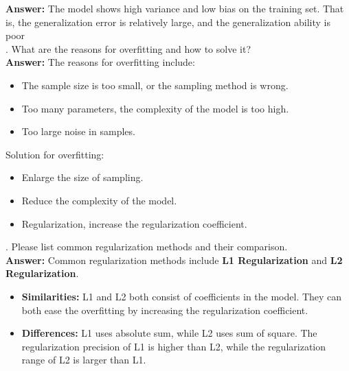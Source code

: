 \documentclass{article}
\begin{document}
\textbf{Answer:} The model shows high variance and low bias on the training set. That is, the generalization error is relatively large, and the generalization ability is poor\\

. What are the reasons for overfitting and how to solve it? \\ 

\textbf{Answer:} The reasons for overfitting include: 

\begin{itemize}
    \item The sample size is too small, or the sampling method is wrong.
    
    \item Too many parameters, the complexity of the model is too high.
    
    \item Too large noise in samples.
\end{itemize}

Solution for overfitting:

\begin{itemize}
    \item Enlarge the size of sampling.
    
    \item Reduce the complexity of the model.
    
    \item Regularization, increase the regularization coefficient.
\end{itemize}  



. Please list common regularization methods and their comparison. \\ 

\textbf{Answer:} Common regularization methods include \textbf{L1 Regularization} and \textbf{L2 Regularization}. 

\begin{itemize}
    \item \textbf{Similarities:} L1 and L2 both consist of coefficients in the model. They can both ease the overfitting by increasing the regularization coefficient.
    
    \item \textbf{Differences:} L1 uses absolute sum, while L2 uses sum of square. The regularization precision of L1 is higher than L2, while the regularization range of L2 is larger than L1.
\end{itemize}
\end{document}
